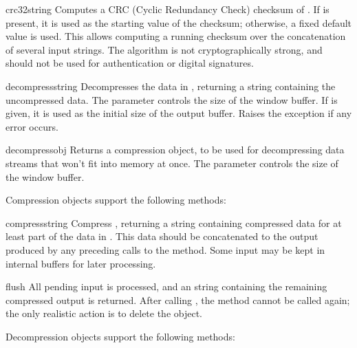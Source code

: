 \begin{funcdesc}{crc32}{string}
  Computes a CRC (Cyclic Redundancy Check)%
  checksum of . If
   is present, it is used as the starting value of the
  checksum; otherwise, a fixed default value is used.  This allows
  computing a running checksum over the concatenation of several
  input strings.  The algorithm is not cryptographically strong, and
  should not be used for authentication or digital signatures.
\end{funcdesc}

\begin{funcdesc}{decompress}{string}
  Decompresses the data in , returning a string containing
  the uncompressed data.  The  parameter controls the size of
  the window buffer.  If  is given, it is used as the
  initial size of the output buffer.  Raises the 
  exception if any error occurs.
\end{funcdesc}

\begin{funcdesc}{decompressobj}{}
  Returns a compression object, to be used for decompressing data
  streams that won't fit into memory at once.  The 
  parameter controls the size of the window buffer.
\end{funcdesc}

Compression objects support the following methods:

\begin{methoddesc}[Compress]{compress}{string}
Compress , returning a string containing compressed data
for at least part of the data in .  This data should be
concatenated to the output produced by any preceding calls to the
 method.  Some input may be kept in internal buffers
for later processing.
\end{methoddesc}

\begin{methoddesc}[Compress]{flush}{}
All pending input is processed, and an string containing the remaining
compressed output is returned.  After calling , the
 method cannot be called again; the only realistic
action is to delete the object.
\end{methoddesc}

Decompression objects support the following methods:

